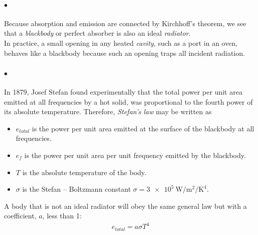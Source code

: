 \documentclass[a4paper]{report}
\begin{document}
            \paragraph{$\bullet$} Because absorption and emission are connected by Kirchhoff’s theorem, 
            we see that a \textit{blackbody} or perfect absorber is also an ideal \textit{radiator}.\\
            In practice, a small opening in any heated \textit{cavity}, such as a port in an oven, behaves 
            like a blackbody because such an opening traps all incident radiation.

            \paragraph{$\bullet$} In 1879, Josef Stefan found experimentally that the total power per unit 
            area emitted at all frequencies by a hot solid, was proportional to the fourth 
            power of its absolute temperature. Therefore, \textit{Stefan’s law} may be written as
            {\tiny \begin{itemize}
                \item $e_{total}$ is the power per unit area emitted at the surface of the blackbody at all frequencies.
                \item $e_f$ is the power per unit area per unit frequency emitted by the blackbody.
                \item $T$ is the absolute temperature of the body.
                \item $\sigma$ is the Stefan – Boltzmann constant $\sigma= \SI[per-mode=symbol]{3e5}{\W\per\m\squared\per\K\tothe{4}}$.
            \end{itemize}}
            A body that is not an ideal radiator will obey the same general law but with a 
            coefficient, $a$, less than 1: \begin{align}\label{emitted power from non-ideal body}e_{total}=a \sigma T^4\end{align}
\end{document}
